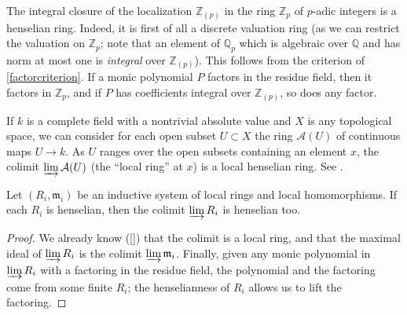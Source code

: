 \begin{example} 
The integral closure of the localization $\mathbb{Z}_{(p)}$ in the
ring $\mathbb{Z}_p$ of $p$-adic integers is a henselian ring. Indeed, it is
first of all a discrete valuation ring (as we can restrict the valuation on
$\mathbb{Z}_p$; note that an element of $\mathbb{Q}_p$ which is algebraic over
$\mathbb{Q}$ and has norm at most one is \emph{integral} over
$\mathbb{Z}_{(p)}$). This follows from the criterion of
\cref{factorcriterion}. If a monic polynomial $P$ factors in the residue field, then
it factors in $\mathbb{Z}_p$, and if $P$ has coefficients integral over
$\mathbb{Z}_{(p)}$, so does any factor.
\end{example} 


\begin{example} 
If $k$ is a complete field with a nontrivial absolute value and $X$ is any
topological space, we can consider for each open subset $U \subset X$ the
ring $\mathcal{A}(U)$ of continuous maps $U \to k$. As $U$ ranges over the open subsets
containing an element $x$, the colimit $\varinjlim \mathcal{A}(U)$ (the
``local ring'' at $x$) is a local henselian ring. See \cite{Ra70}.
\end{example} 


\begin{proposition} 
Let $(R_i, \mathfrak{m}_i)$ be an inductive system of local rings and local
homomorphisms. If each $R_i$ is henselian, then the colimit $\varinjlim R_i$
is henselian too.
\end{proposition} 
\begin{proof} 
We already know (\cref{}) that the colimit is a local ring, and that
the maximal ideal of $\varinjlim R_i$ is the colimit $\varinjlim
\mathfrak{m}_i$. 
Finally, given any monic polynomial in $\varinjlim R_i$ with a factoring in the residue
field, the polynomial and the factoring come from some finite $R_i$; the
henselianness of $R_i$ allows us to lift the factoring. 
\end{proof} 


